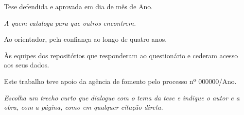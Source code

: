\documentclass[
  12pt,
  twoside,          %
  openright,
  a4paper,
  chapter=TITLE,    %
  section=TITLE,    %
  english,
  french,
  brazil            %
]{abntex2}
\newif\ifinstrucoes
\newcommand{\instrucao}[1]{\ifinstrucoes{\color{gray}\small\itshape #1\par}\fi}
\begin{document}
\begin{folhadeaprovacao}
  \begin{center}
    {\large\imprimirautor}

    \vspace*{\fill}
    {\sffamily\bfseries\Large\imprimirtitulo}
    \vspace*{\fill}

    \hspace{.45\textwidth}
    \begin{minipage}{.5\textwidth}
      \small\imprimirpreambulo
    \end{minipage}%
    \vspace*{\fill}
  \end{center}

  Tese defendida e aprovada em dia de mês de Ano.

\end{folhadeaprovacao}

\begin{dedicatoria}
  \vspace*{\fill}
  \centering\itshape
  A quem cataloga para que outros encontrem.
  \vspace*{\fill}
\end{dedicatoria}

\begin{agradecimentos}
  \instrucao{Elemento opcional. Na tese, cite a agência de fomento com o número do processo, o período de doutorado sanduíche, se houver, e as instituições que cederam dados.}
  Ao orientador, pela confiança ao longo de quatro anos.

  Às equipes dos repositórios que responderam ao questionário e cederam acesso aos seus dados.

  Este trabalho teve apoio da agência de fomento pelo processo nº 000000/Ano.
\end{agradecimentos}

\begin{epigrafe}
  \vspace*{\fill}
  \begin{flushright}
    \begin{minipage}{.6\textwidth}
      \itshape Escolha um trecho curto que dialogue com o tema da tese e indique o autor e a obra, com a página, como em qualquer citação direta.
    \end{minipage}
  \end{flushright}
\end{epigrafe}
\end{document}
